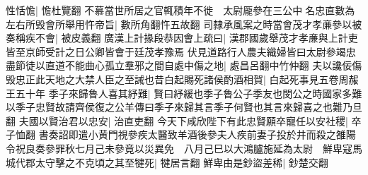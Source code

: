 性恬憺|{
	憺杜覽翻}
不慕當世所居之官輒積年不徙　太尉龎參在三公中名忠直數為左右所毁會所舉用忤帝旨|{
	數所角翻忤五故翻}
司隸承風案之時當會茂才孝亷參以被奏稱疾不會|{
	被皮義翻}
廣漢上計掾段恭因會上疏曰|{
	漢郡國歲舉茂才孝亷與上計吏皆至京師受計之日公卿皆會于廷茂孝豫焉}
伏見道路行人農夫織婦皆曰太尉參竭忠盡節徒以直道不能曲心孤立羣邪之間自處中傷之地|{
	處昌呂翻中竹仲翻}
夫以讒佞傷毁忠正此天地之大禁人臣之至誡也昔白起賜死諸侯酌酒相賀|{
	白起死事見五卷周赧王五十年}
季子來歸魯人喜其紓難|{
	賢曰紓緩也季子魯公子季友也閔公之時國家多難以季子忠賢故請齊侯復之公羊傳曰季子來歸其言季子何賢也其言來歸喜之也難乃旦翻}
夫國以賢治君以忠安|{
	治直吏翻}
今天下咸欣陛下有此忠賢願卒寵任以安社稷|{
	卒子恤翻}
書奏詔即遣小黄門視參疾太醫致羊酒後參夫人疾前妻子投於井而殺之雒陽令祝良奏參罪秋七月己未參竟以災異免　八月己巳以大鴻臚施延為太尉　鮮卑寇馬城代郡太守擊之不克頃之其至犍死|{
	犍居言翻}
鮮卑由是鈔盜差稀|{
	鈔楚交翻}


